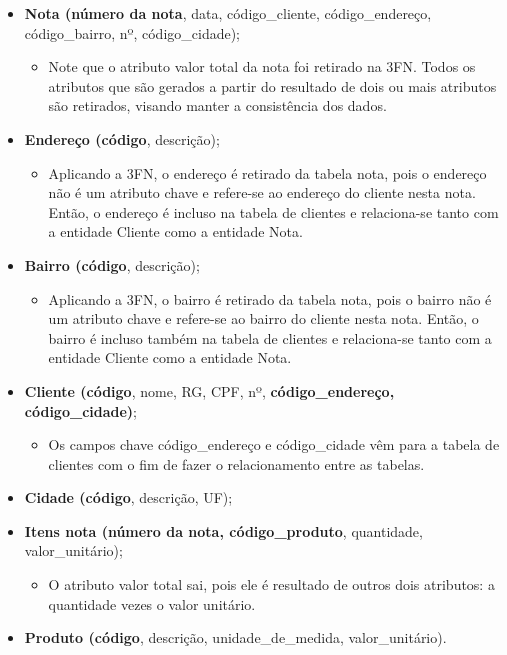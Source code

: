 \documentclass{article}
\begin{document}
\begin{itemize}
    \item \textbf{Nota (número da nota}, data, código\_cliente, código\_endereço, código\_bairro, nº, código\_cidade);
    \begin{itemize}
        \item Note que o atributo valor total da nota foi retirado na 3FN. Todos os atributos que são gerados a partir do resultado de dois ou mais atributos são retirados, visando manter a consistência dos dados.
    \end{itemize}
    \item \textbf{Endereço (código}, descrição);
    \begin{itemize}
        \item Aplicando a 3FN, o endereço é retirado da tabela nota, pois o endereço não é um atributo chave e refere-se ao endereço do cliente nesta nota. Então, o endereço é incluso na tabela de clientes e relaciona-se tanto com a entidade Cliente como a entidade Nota.
    \end{itemize}
    \item \textbf{Bairro (código}, descrição);
    \begin{itemize}
        \item Aplicando a 3FN, o bairro é retirado da tabela nota, pois o bairro não é um atributo chave e refere-se ao bairro do cliente nesta nota. Então, o bairro é incluso também na tabela de clientes e relaciona-se tanto com a entidade Cliente como a entidade Nota.
    \end{itemize}
    \item \textbf{Cliente (código}, nome, RG, CPF, nº, \textbf{código\_endereço, código\_cidade)};
    \begin{itemize}
        \item Os campos chave código\_endereço e código\_cidade vêm para a tabela de clientes com o fim de fazer o relacionamento entre as tabelas.
    \end{itemize}
    \item \textbf{Cidade (código}, descrição, UF);
    \item \textbf{Itens nota (número da nota, código\_produto}, quantidade, valor\_unitário);
    \begin{itemize}
        \item O atributo valor total sai, pois ele é resultado de outros dois atributos: a quantidade vezes o valor unitário.
    \end{itemize}
    \item \textbf{Produto (código}, descrição, unidade\_de\_medida, valor\_unitário).
\end{itemize}
\end{document}
